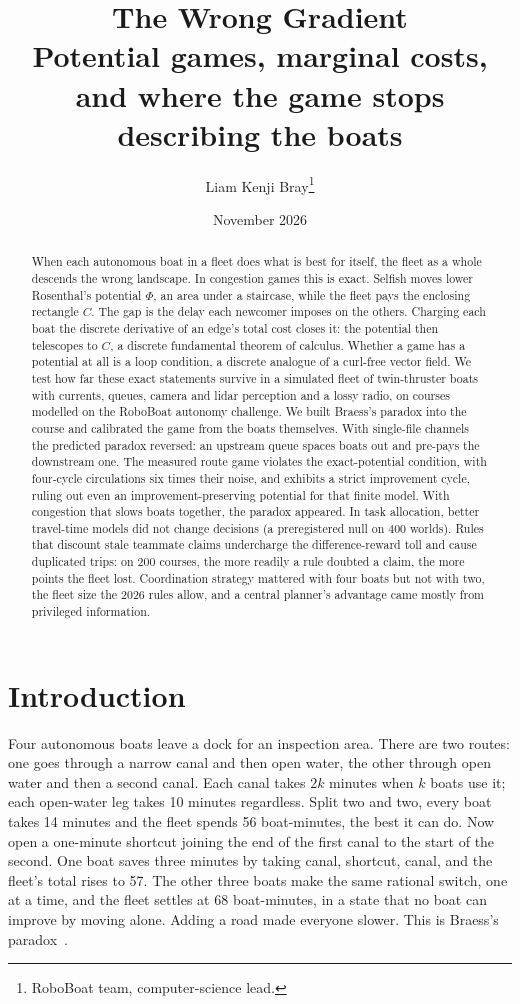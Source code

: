 \documentclass[11pt]{article}
\title{\textbf{The Wrong Gradient}\\[3pt]
\large Potential games, marginal costs, and where the game stops describing the boats}
\author{Liam Kenji Bray\thanks{RoboBoat team, computer-science lead.}}
\date{November 2026}
\theoremstyle{definition}
\begin{document}
\maketitle

\begin{abstract}
\noindent When each autonomous boat in a fleet does what is best for itself, the fleet as a whole descends the wrong landscape. In congestion games this is exact. Selfish moves lower Rosenthal's potential $\Phi$, an area under a staircase, while the fleet pays the enclosing rectangle $C$. The gap is the delay each newcomer imposes on the others. Charging each boat the discrete derivative of an edge's total cost closes it: the potential then telescopes to $C$, a discrete fundamental theorem of calculus. Whether a game has a potential at all is a loop condition, a discrete analogue of a curl-free vector field. We test how far these exact statements survive in a simulated fleet of twin-thruster boats with currents, queues, camera and lidar perception and a lossy radio, on courses modelled on the RoboBoat autonomy challenge. We built Braess's paradox into the course and calibrated the game from the boats themselves. With single-file channels the predicted paradox reversed: an upstream queue spaces boats out and pre-pays the downstream one. The measured route game violates the exact-potential condition, with four-cycle circulations six times their noise, and exhibits a strict improvement cycle, ruling out even an improvement-preserving potential for that finite model. With congestion that slows boats together, the paradox appeared. In task allocation, better travel-time models did not change decisions (a preregistered null on 400 worlds). Rules that discount stale teammate claims undercharge the difference-reward toll and cause duplicated trips: on 200 courses, the more readily a rule doubted a claim, the more points the fleet lost. Coordination strategy mattered with four boats but not with two, the fleet size the 2026 rules allow, and a central planner's advantage came mostly from privileged information.
\end{abstract}

\section{Introduction}
\label{sec:intro}
Four autonomous boats leave a dock for an inspection area. There are two routes: one goes through a narrow canal and then open water, the other through open water and then a second canal. Each canal takes $2k$ minutes when $k$ boats use it; each open-water leg takes 10 minutes regardless. Split two and two, every boat takes 14 minutes and the fleet spends 56 boat-minutes, the best it can do. Now open a one-minute shortcut joining the end of the first canal to the start of the second. One boat saves three minutes by taking canal, shortcut, canal, and the fleet's total rises to 57. The other three boats make the same rational switch, one at a time, and the fleet settles at 68 boat-minutes, in a state that no boat can improve by moving alone. Adding a road made everyone slower. This is Braess's paradox~\cite{braess1968,braess2005}.
\end{document}
